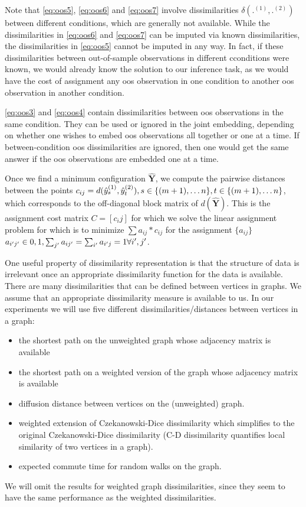 \documentclass[12pt,oneside,final]{thesis}\usepackage[]{graphicx}\usepackage[]{color}
\begin{document}
Note that \ref{eq:oos5}, \ref{eq:oos6} and \ref{eq:oos7} involve dissimilarities $\delta(.^{(1)},.^{(2)})$ between different conditions, which are generally not available. While  the dissimilarities in \ref{eq:oos6} and \ref{eq:oos7} can be imputed via known dissimilarities, the dissimilarities in \ref{eq:oos5}  cannot be imputed in any way. In fact, if these dissimilarities between out-of-sample observations in different cconditions were known, we would already know the solution to our inference task, as we would have the cost of assignment any oos observation in one condition to another oos observation in another condition.

\ref{eq:oos3} and \ref{eq:oos4} contain dissimilarities between oos observations in the same condition. They can be  used or ignored in the joint embedding, depending on whether one wishes to embed oos observations all together or one at a time. If between-condition oos dissimilarities are ignored, then one would get the same answer if the oos observations are embedded one at a time.

Once we find a minimum configuration ${ \hat{\mathbf{Y}}}$, we compute the pairwise distances between the points $c_{ij}=d(\yhat^{(1)}_s,\yhat^{(2)}_t),\onespace s \in \{(m+1),\ldots n\}, t \in  \{(m+1),\ldots n\}$, which corresponds to the off-diagonal block matrix of $d({ \hat{\mathbf{Y}}})$. This is the assignment cost matrix $C=\left[c_ij \right]$ for which we solve the linear assignment problem for which is to minimize $\sum a_{ij}*c_{ij}$  for the assignment $\{a_{ij}\}$
$a_{i'j'} \in {0,1},\onespace \sum_{j'} a_{ij'} =\sum_{i'} a_{i'j} =1 \onespace \forall i',j'$.
 
One useful property of dissimilarity representation is that the structure of data is irrelevant once an appropriate dissimilarity function  for the data is available. 
There are many dissimilarities that can be defined between vertices in graphs. We assume that an appropriate dissimilarity measure is available to us.
In our experiments we will use five different dissimilarities/distances between vertices in a graph:
\begin{itemize}
 \item the shortest path on the  unweighted graph whose adjacency matrix is available
 \item the shortest path on a weighted version of the graph whose adjacency matrix is available
 \item diffusion distance between vertices on the (unweighted) graph.
 \item weighted extension of Czekanowski-Dice dissimilarity\cite{DICE,weightedDICE} which simplifies to the original Czekanowski-Dice dissimilarity (C-D dissimilarity  quantifies local similarity of two vertices in a graph).
 \item expected commute time for random walks on the graph.
 \end{itemize}
 We will omit the results for weighted graph dissimilarities, since they seem to have the same performance as the weighted dissimilarities.
 
\end{document}
